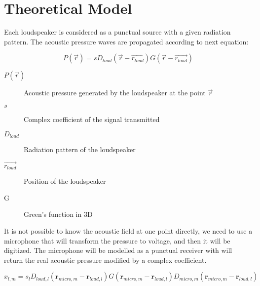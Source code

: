 \section{Theoretical Model}
\label{TheoreticalModelLabel}

Each loudspeaker is considered as a punctual source with a given radiation pattern. The acoustic pressure waves are propagated according to next equation:

\begin{equation}
P(\vec{r}) = s D_{loud}(\vec{r} - \vec{r_{loud}}) G(\vec{r} - \vec{r_{loud}})
\end{equation}

\begin{description}
	\item[$P(\vec{r})$] Acoustic pressure generated by the loudspeaker at the point $\vec{r}$
	\item[$s$] Complex coefficient of the signal transmitted
	\item[$D_{loud}$] Radiation pattern of the loudspeaker
	\item[$\vec{r_{loud}}$] Position of the loudspeaker
	\item[G] Green's function in 3D
\end{description}

It is not possible to know the acoustic field at one point directly, we need to use a microphone that will transform the pressure to voltage, and then it will be digitized. The microphone will be modelled as a punctual receiver with will return the real acoustic pressure modified by a complex coefficient.


%

\begin{equation}
x_{l,m} = s_{l} D_{loud,l}(\mathbf{r}_{micro,m} - \mathbf{r}_{loud,l}) G(\mathbf{r}_{micro,m} - \mathbf{r}_{loud,l}) D_{micro,m}(\mathbf{r}_{micro,m} - \mathbf{r}_{loud,l})
\label{transFunction}
\end{equation}

